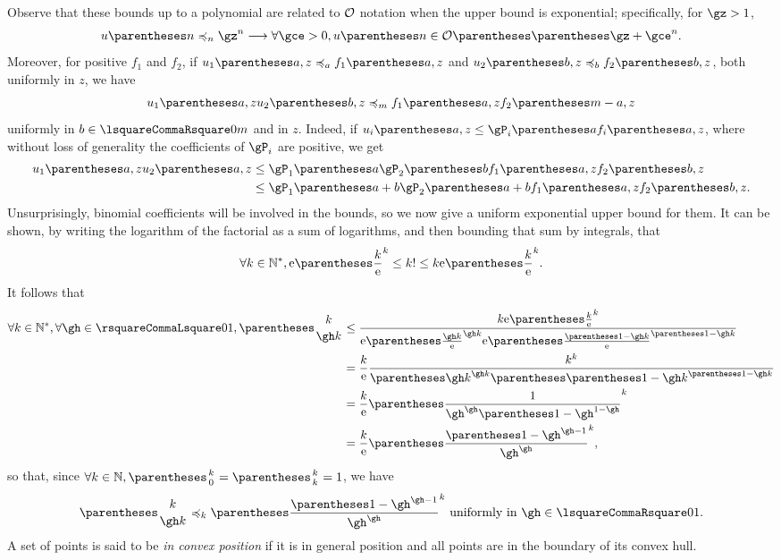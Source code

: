 Observe that these bounds up to a polynomial are related to $\mathcal{O}$ notation when the upper bound
is exponential; specifically, for $\gz>1$,
\[u \of n \preccurlyeq_n \gz^n \Implies \forall\gce>0, u\of n\in\BigO\of{\pa{\gz+\gce}^n}\text.\]
Moreover, for positive $f_1$ and $f_2$, if
$u_1\of{a,z}\preccurlyeq_a f_1\of{a,z}$ and
$u_2\of{b,z}\preccurlyeq_b f_2\of{b,z}$,
both uniformly in $z$, we have\[
u_1\of{a,z}u_2\of{b,z}\preccurlyeq_{m} f_1\of{a,z}f_2\of{m-a,z}
\]
uniformly in $b\in\intclos 0 m$ and in $z$. Indeed, if $u_i\of{a,z}\leq \gP_i\of{a} f_i\of{a,z}$,
where without loss of generality the coefficients of $\gP_i$ are positive, we get
\begin{align*}u_1\of{a,z}u_2\of{a,z}
&\leq \gP_1\of{a}\gP_2\of{b} f_1\of{a,z}f_2\of{b,z}\\
&\leq \gP_1\of{a+b}\gP_2\of{a+b} f_1\of{a,z}f_2\of{b,z}\text.\end{align*}
Unsurprisingly, binomial coefficients will be involved in the bounds, so we now give a uniform exponential
upper bound for them.
It can be shown, by writing the logarithm of the factorial as a sum of logarithms,
and then bounding that sum by integrals, that\[
\forall k\in \Positives, \E \pa{\frac{k}{\E}}^k \leq \Factorial k \leq k \E \pa{\frac{k}{\E}}^k\text.
\]
It follows that\begin{align*}
\forall k\in \Positives, \forall \gh\in\intopen 0 1, \binom{k}{\gh k} &\leq
\frac{k \E \pa{\frac{k}{\E}}^k}{\E \pa{\frac{\gh k}{\E}}^{\gh k} \E \pa{\frac{\pa{1-\gh} k}{\E}}^{\pa{1-\gh}k}}\\
&=\frac{k}{\E} \frac{k^k}{\pa{\gh k}^{\gh k}\pa{\pa{1-\gh} k}^{\pa{1-\gh} k}} \\
&=\frac{k}{\E} \pa{\frac{1}{\gh^\gh\pa{1-\gh}^{1-\gh}}}^k \\
&=\frac{k}{\E} \pa{\frac{\pa{1-\gh}^{\gh-1}}{\gh^\gh}}^k\text,
\end{align*}
so that, since $\forall k\in \N, \binom k 0 = \binom k k = 1$, we have
\begin{equation}
\binom k {\gh k} \preccurlyeq_k \pa{\frac{\pa{1-\gh}^{\gh-1}}{\gh^\gh}}^k \text{ uniformly in $\gh\in\intclos 0 1$.}
\end{equation}
A set of points is said to be \emph{in convex position} if it is in general position and
all points are in the boundary of its convex hull.

